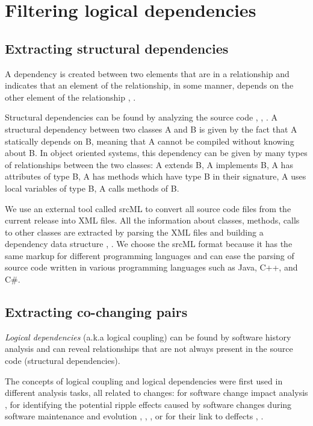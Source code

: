 \chapter{Filtering logical dependencies}
\label{extraction}


\section{Extracting structural dependencies}
\label{sec:sd_extraction}
A dependency is created between two elements that are in a relationship and indicates that an element of the relationship, in some manner, depends on the other element of the relationship \cite{Booch:2004:OAD:975416}, \cite{Cataldo2009SoftwareDW}.

Structural dependencies can be found by analyzing the source code \cite{Sangal:2005:UDM:1094811.1094824}, \cite{CalloArias2011}, \cite{structdep}. A structural dependency between two classes A and B is given by the fact that A statically depends on B, meaning that A cannot be compiled without knowing about B. In object oriented systems, this dependency can be given by many types of relationships between the two classes: A extends B, A implements B, A has attributes of type B, A has methods which have type B in their signature, A uses local variables of type B, A calls methods of B.


 We use an external tool called srcML \cite{srcML} to convert all source code files from the current release into XML files. All the information about classes, methods, calls to other classes are extracted by parsing the XML files and building a dependency data structure \cite{2003:XLC:851042.857028},
\cite{Collard:2011:LTF:2067850.2068011}. We choose the srcML format because it has the same markup for different programming languages and can ease the parsing of source code written in various programming languages such as Java, C++, and C\#.


\section{Extracting co-changing pairs}
\label{sec:copairs_extraction}

\textit{Logical dependencies} (a.k.a logical coupling) can be found by software history analysis and can reveal relationships that are not always present in the source code (structural dependencies).  

The concepts of logical coupling and logical dependencies were first used in different analysis tasks, all related to changes: for software change impact analysis \cite{1553643}, for identifying the potential ripple effects caused by software changes during software maintenance and evolution \cite{DBLP:conf/issre/OlivaG15}, \cite{Oliva:2011:ISL:2067853.2068086}, \cite{Poshyvanyk2009}, \cite{posh2010} or for their link to deffects \cite{wiese}, \cite{Zimmermann:2004:MVH:998675.999460}.

